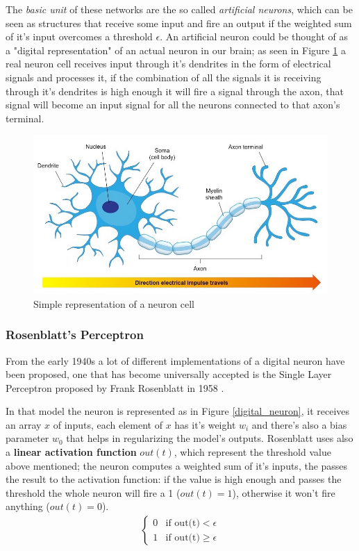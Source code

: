 \documentclass[11pt,a4paper,titlepage]{book}
\begin{document}
The \textit{basic unit} of these networks are the so called \textit{artificial neurons}, which can be seen as structures that receive some input and fire an output if the weighted sum of it's input overcomes a threshold $\epsilon$. 
\newline
\newline
An artificial neuron could be thought of as a "digital representation" of an actual neuron in our brain; as seen in Figure \ref{neuron_med} a real neuron cell receives input through it's dendrites in the form of electrical signals and processes it, if the combination of all the signals it is receiving through it's dendrites is high enough it will fire a signal through the axon, that signal will become an input signal for all the neurons connected to that axon's terminal.
\begin{figure}[ht]
    \includegraphics[scale=0.45]{imgs/ch_1/neuron_med.jpeg}
    \centering
    \caption{Simple representation of a neuron cell}
    \label{neuron_med}
\end{figure}
\subsubsection{Rosenblatt's Perceptron}
From the early 1940s a lot of different implementations of a digital neuron have been proposed, one that has become universally accepted is the Single Layer Perceptron proposed by Frank Rosenblatt in 1958 \cite{Rosenblatt1958ThePA}.

In that model the neuron is represented as in Figure \ref{digital_neuron}, it receives an array $x$ of inputs, each element of $x$ has it's weight $w_i$ and there's also a bias parameter $w_0$ that helps in regularizing the model's outputs. Rosenblatt uses also a \textbf{linear activation function} $out(t)$, which represent the threshold value above mentioned; the neuron computes a weighted sum of it's inputs, the passes the result to the activation function: if the value is high enough and passes the threshold the whole neuron will fire a 1 ($out(t)=1$), otherwise it won't fire anything ($out(t)=0$).
\begin{align}
    \begin{cases}
        0   &   \text{if out(t)} < \epsilon \\
        1   &   \text{if out(t)} \geq \epsilon
    \end{cases}
\end{align}
\end{document}
